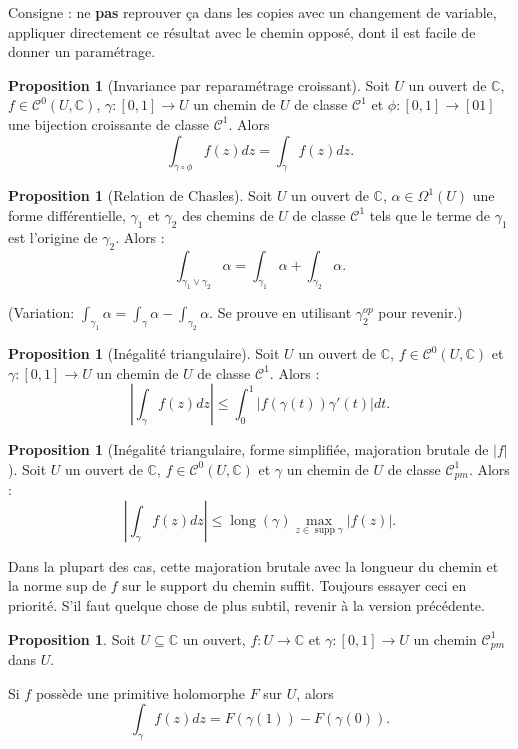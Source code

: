 \documentclass[11pt,a4paper]{article}
\newcommand{\C}{\mathbb{C}}
\DeclareMathOperator{\supp}{supp}
\theoremstyle{definition}
\newtheorem{proposition}[theoreme]{Proposition}
\theoremstyle{plain}
\begin{document}
Consigne : ne \textbf{pas} reprouver ça dans les copies avec un changement de variable, appliquer directement ce résultat avec le chemin opposé, dont il est facile de donner un paramétrage.

\begin{proposition}[Invariance par reparamétrage croissant]
Soit $U$ un ouvert de $\C$, $f\in \mathcal C^0(U,\C)$,  $\gamma:[0,1]\to U$ un chemin de $U$ de classe $\mathcal C^1$ et $\phi : [0,1]\to [01]$ une bijection croissante de classe $\mathcal C^1$.
Alors 
\[  \int_{\gamma\circ \phi } f(z)dz = \int_\gamma f(z)dz.\]
\end{proposition}

\begin{proposition}[Relation de Chasles]
Soit $U$ un ouvert de $\C$, $\alpha\in \Omega^1(U)$ une forme différentielle,  $\gamma_1$ et $\gamma_2$ des chemins de $U$ de classe $\mathcal C^1$ tels que le terme de $\gamma_1$ est l'origine de $\gamma_2$.
Alors : 
\[  \int_{\gamma_1\vee \gamma_2} \alpha = \int_{\gamma_1} \alpha+\int_{\gamma_2} \alpha.\]
\end{proposition}

(Variation: $\int_{\gamma_1} \alpha = \int_{\gamma} \alpha - \int_{\gamma_2} \alpha$.
Se prouve en utilisant $\gamma_2^{op}$ pour \og revenir\fg.)


\begin{proposition}[Inégalité triangulaire]
Soit $U$ un ouvert de $\C$, $f\in \mathcal C^0(U,\C)$ et $\gamma:[0,1]\to U$ un chemin de $U$ de classe $\mathcal C^1$.
Alors :
\[ \left| \int_\gamma f(z)dz\right| \leq \int_0^1 \left|f(\gamma(t))\gamma'(t)\right|dt.\]
\end{proposition}

\begin{proposition}[Inégalité triangulaire, forme simplifiée, majoration brutale de $|f|$]
Soit $U$ un ouvert de $\C$, $f\in \mathcal C^0(U,\C)$ et $\gamma$ un chemin de $U$ de classe $\mathcal C^1_{pm}$.
Alors : 
\[ \left| \int_\gamma f(z)dz\right| \leq \operatorname{long}(\gamma)\max_{z\in \supp \gamma}|f(z)|.\]
\end{proposition}
Dans la plupart des cas, cette majoration brutale avec la longueur du chemin et la norme sup de $f$ sur le support du chemin suffit. Toujours essayer ceci en priorité. S'il faut quelque chose de plus subtil, revenir à la version précédente.

\begin{proposition}
Soit $U\subseteq \C$ un ouvert, $f:U\to\C$  et $\gamma : [0,1]\to U$ un chemin $\mathcal C^1_{pm}$ dans $U$.

Si $f$ possède une primitive holomorphe $F$ sur $U$, alors  
\[\int_\gamma f(z)dz = F(\gamma(1)) - F(\gamma(0)).\]
\end{proposition}
\end{document}
